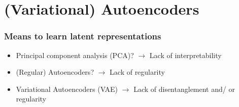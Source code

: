 \documentclass{beamer}
\theoremstyle{definition}
\begin{document}
    \section{(Variational) Autoencoders}
    \begin{frame}
      \frametitle{Means to learn latent representations}
      \begin{itemize}
        \item Principal component analysis (PCA)? $\rightarrow$ Lack of interpretability
        \item (Regular) Autoencoders? $\rightarrow$ Lack of regularity
        \item Variational Autoencoders (VAE) $\rightarrow$ Lack of disentanglement and/ or regularity
      \end{itemize}
    \end{frame}
\end{document}
